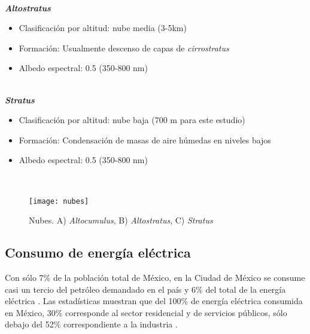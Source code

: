\\

\textit{\textbf{Altostratus}}

\begin{itemize}

    \item Clasificación por altitud: nube media (3-5km)
    
    \item Formación: Usualmente descenso de capas de \textit{cirrostratus}
    
    \item Albedo espectral: 0.5 (350-800 nm)
    
\end{itemize}

\\

\textit{\textbf{Stratus}}

\begin{itemize}

    \item Clasificación por altitud: nube baja (700 m para este estudio)
    
    \item Formación: Condensación de masas de aire húmedas en niveles bajos
    
    \item Albedo espectral: 0.5 (350-800 nm)
    
\end{itemize}

\\

\begin{figure}[htb]
  \centering
    \texttt{[image: nubes]}
  \caption{Nubes. A) \textit{Altocumulus}, B) \textit{Altostratus}, C) \textit{Stratus} \citep{Metoffice2019}}
  \label{nubes}
\end{figure}

\newpage

\subsection{Consumo de energía eléctrica}
\label{subsec:consumoenergiaelectrica}

Con sólo 7\% de la población total de México, en la Ciudad de México se consume casi un tercio del petróleo demandado en el país y 6\% del total de la energía eléctrica \citep{SENER2013}. Las estadísticas muestran que del 100\% de energía eléctrica consumida en México, 30\% corresponde al sector residencial y de servicios públicos, sólo debajo del 52\% correspondiente a la industria \citep{Ramos2012}.\\

